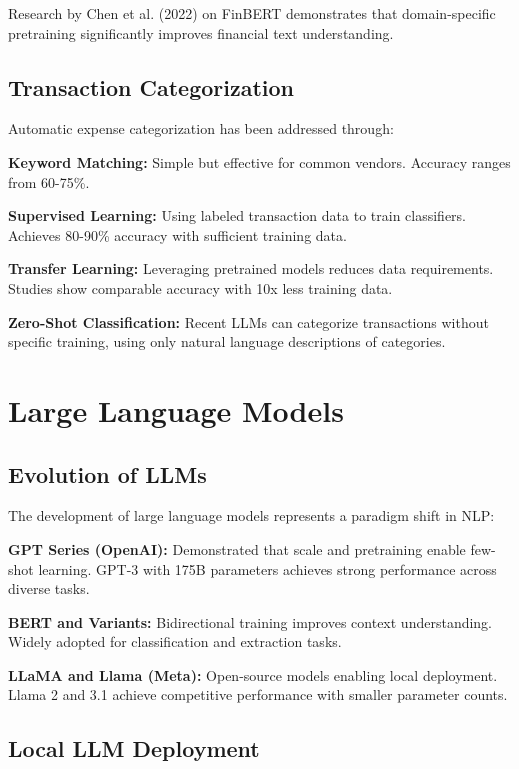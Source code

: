 \documentclass[11pt,a4paper]{report}
\begin{document}
Research by Chen et al. (2022) on FinBERT demonstrates that domain-specific pretraining significantly improves financial text understanding.

\subsection{Transaction Categorization}

Automatic expense categorization has been addressed through:

\textbf{Keyword Matching:} Simple but effective for common vendors. Accuracy ranges from 60-75\%.

\textbf{Supervised Learning:} Using labeled transaction data to train classifiers. Achieves 80-90\% accuracy with sufficient training data.

\textbf{Transfer Learning:} Leveraging pretrained models reduces data requirements. Studies show comparable accuracy with 10x less training data.

\textbf{Zero-Shot Classification:} Recent LLMs can categorize transactions without specific training, using only natural language descriptions of categories.

\section{Large Language Models}

\subsection{Evolution of LLMs}

The development of large language models represents a paradigm shift in NLP:

\textbf{GPT Series (OpenAI):} Demonstrated that scale and pretraining enable few-shot learning. GPT-3 with 175B parameters achieves strong performance across diverse tasks.

\textbf{BERT and Variants:} Bidirectional training improves context understanding. Widely adopted for classification and extraction tasks.

\textbf{LLaMA and Llama (Meta):} Open-source models enabling local deployment. Llama 2 and 3.1 achieve competitive performance with smaller parameter counts.

\subsection{Local LLM Deployment}
\end{document}
